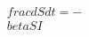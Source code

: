 \documentclass[preview]{standalone}
\begin{document}
\begin{align*}
\quad\\frac{dS}{dt} = -\quad\\beta SI
\end{align*}
\end{document}
